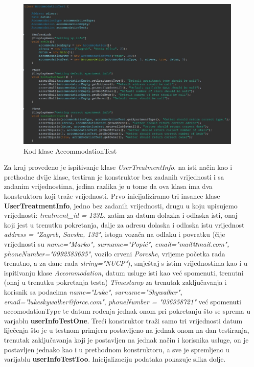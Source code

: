 			\begin{figure}[H]
				\includegraphics[width=\textwidth]{slike/AccommodationTest.JPG}
				\caption{Kod klase AccommodationTest}
				\label{AccommodationTest}
			\end{figure}
			
			Za kraj provedeno je ispitivanje klase \textit{UserTreatmentInfo}, na isti način kao i prethodne dvije klase, testiran je konstruktor bez zadanih vrijednosti i sa zadanim vrijednostima, jedina razlika je u tome da ova klasa ima dva konstruktora koji traže vrijednosti. Prvo inicijaliziramo tri insance klase \textbf{UserTreatmentInfo}, jedno bez zadanih vrijednosti, drugu u koju upisujemo vrijednosti: \textit{treatment\_id = 123L}, zatim za datum dolazka i odlaska isti, onaj koji jest u trenutku pokretanja, dalje za adresu dolaska i odlaska istu vrijednost \textit{address = "Zagreb, Savska, 132"}, istoga vozača na odlaku i povratku (čije vrijednosti su \textit{name="Marko", surname="Popić", \newline email="mail@mail.com", phoneNumber="0992583695"}, vozilo crveni \textit{Porcshe}, vrijeme početka rada trenutno, a za dane rada \textit{string="NUCP"}), smještaj s istim vrijednostima kao i u ispitivanju klase \textit{Accommodation}, datum usluge isti kao već spomenuti, trenutni (onaj u trenutku pokretanja testa) \textit{Timestamp} za trenutak zaključavanja i korisnik sa podacima \textit{name="Luke"}, \textit{surname="Skywalker"}, \newline \textit{email="lukeskywalker@force.com"}, \textit{phoneNumber = "036958721"} već spomenuti {accomodationType} te datum rođenja jednak onom pri pokretanju što se sprema u varjablu \textbf{userInfoTestOne}. Treći konstruktor traži samo tri vrijednosti datum liječenja što je u testnom primjeru postavljeno na jednak onom na dan testiranja, trenutak zaključavanja koji je postavljen na jednak način i korisnika usluge, on je postavljen jednako kao i u prethodnom konstruktoru, a sve je spremljeno u varijablu \textbf{userInfoTestToo}. Inicijalizaciju podataka pokazuje slika dolje.
			
